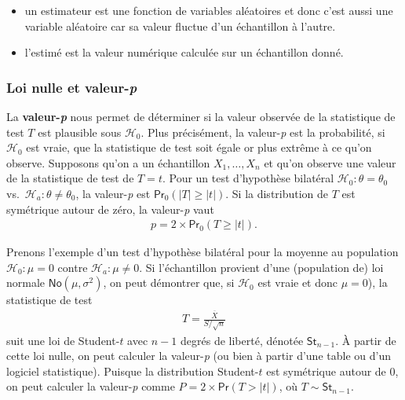 \documentclass[
  11pt,
  letterpaper,
]{article}
\providecommand{\tightlist}{%
  \setlength{\itemsep}{0pt}\setlength{\parskip}{0pt}}
\theoremstyle{definition}
\theoremstyle{definition}
\theoremstyle{definition}
\theoremstyle{definition}
\theoremstyle{remark}
\begin{document}
\begin{itemize}
\tightlist
\item
  un estimateur est une fonction de variables aléatoires et donc c'est aussi une variable aléatoire car sa valeur fluctue d'un échantillon à l'autre.
\item
  l'estimé est la valeur numérique calculée sur un échantillon donné.
\end{itemize}

\hypertarget{loi-nulle-et-valeur-p}{%
\subsubsection{\texorpdfstring{Loi nulle et valeur-\emph{p}}{Loi nulle et valeur-p}}\label{loi-nulle-et-valeur-p}}

La \textbf{valeur-\emph{p}} nous permet de déterminer si la valeur observée de la statistique de test \(T\) est plausible sous \(\mathscr{H}_0\). Plus précisément, la valeur-\emph{p} est la probabilité, si \(\mathscr{H}_0\) est vraie, que la statistique de test soit égale or plus extrême à ce qu'on observe. Supposons qu'on a un échantillon \(X_1, \ldots, X_n\) et qu'on observe une valeur de la statistique de test de \(T=t\). Pour un test d'hypothèse bilatéral \(\mathscr{H}_0:\theta=\theta_0\) vs.~\(\mathscr{H}_a:\theta \neq \theta_0\), la valeur-\emph{p} est
\(\mathsf{Pr}_0(|T| \geq |t|)\). Si la distribution de \(T\) est symétrique autour de zéro, la valeur-\emph{p} vaut
\begin{align*}
p = 2 \times \mathsf{Pr}_0(T \geq |t|).
\end{align*}

Prenons l'exemple d'un test d'hypothèse bilatéral pour la moyenne au population \(\mathscr{H}_0:\mu=0\) contre \(\mathscr{H}_a:\mu \neq 0\). Si l'échantillon provient d'une (population de) loi normale \(\mathsf{No}(\mu, \sigma^2)\), on peut démontrer que, si \(\mathscr{H}_0\) est vraie et donc \(\mu=0\)), la statistique de test
\begin{align*}
T = \frac{\overline{X}}{S/\sqrt{n}}
\end{align*}
suit une loi de Student-\(t\) avec \(n-1\) degrés de liberté, dénotée \(\mathsf{St}_{n-1}\). À partir de cette loi nulle, on peut calculer la valeur-\emph{p} (ou bien à partir d'une table ou d'un logiciel statistique). Puisque la distribution Student-\(t\) est symétrique autour de \(0\), on peut calculer la valeur-\emph{p} comme \(P = 2\times\mathsf{Pr}(T > |t|)\), où \(T \sim \mathsf{St}_{n-1}\).
\end{document}
